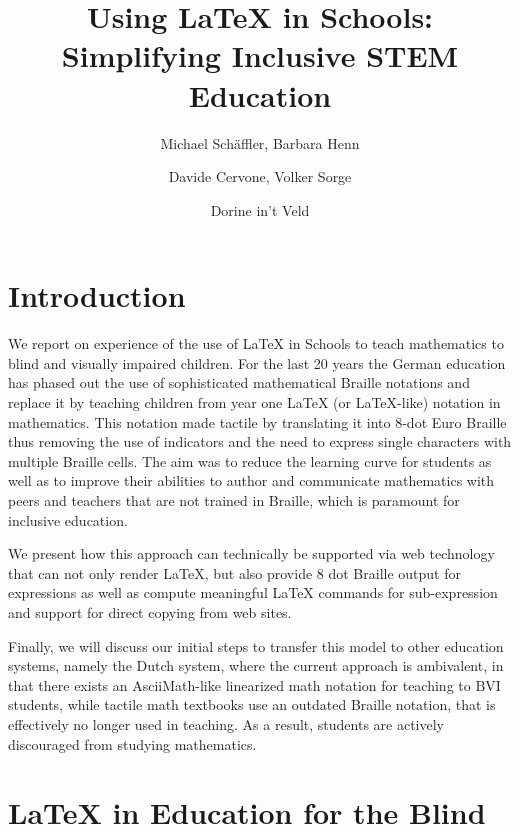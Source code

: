 \documentclass{article}
\begin{document}
\title{Using {\LaTeX} in Schools: Simplifying Inclusive STEM Education}

\author[1]{Michael Schäffler, Barbara Henn}

\author[2]{Davide Cervone, Volker Sorge}

\author[3]{Dorine in't Veld}

\date{}
\maketitle


\section{Introduction}\label{sec:intro}

We report on experience of the use of {\LaTeX} in Schools to teach mathematics
to blind and visually impaired children. For the last 20 years the German
education has phased out the use of sophisticated mathematical Braille notations
and replace it by teaching children from year one {\LaTeX} (or {\LaTeX}-like)
notation in mathematics. This notation made tactile by translating it into 8-dot
Euro Braille thus removing the use of indicators and the need to express single
characters with multiple Braille cells. The aim was to reduce the learning curve
for students as well as to improve their abilities to author and communicate
mathematics with peers and teachers that are not trained in Braille, which is
paramount for inclusive education.

We present how this approach can technically be supported via web technology that
can not only render {\LaTeX}, but also provide 8 dot Braille output for expressions
as well as compute meaningful {\LaTeX} commands for sub-expression and support for
direct copying from web sites.

Finally, we will discuss our initial steps to transfer this model to other
education systems, namely the Dutch system, where the current approach is
ambivalent, in that there exists an AsciiMath-like linearized math notation for
teaching to BVI students, while tactile math textbooks use an outdated Braille
notation, that is effectively no longer used in teaching.  As a result, students
are actively discouraged from studying mathematics.

\section{{\LaTeX} in Education for the Blind}\label{sec:latex-in-schools}
\end{document}
